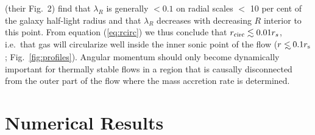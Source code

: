 \documentclass[usenatbib,fleqn]{mn2e}
\newcommand\lsim{\mathrel{\rlap{\lower4pt\hbox{\hskip1pt$\sim$}}
    \raise1pt\hbox{$<$}}}
\begin{document}
\citet{EmsellemCappellari+:2007a} (their Fig.~2) find that $\lambda_R$
is generally $< 0.1$ on radial scales $<$ 10 per cent of the galaxy
half-light radius and that $\lambda_R$ decreases with decreasing $R$ interior to this point.  From equation (\ref{eq:rcirc}) we thus conclude that $r_{\rm
  circ} \lesssim 0.01r_{s}$, i.e.~that gas will circularize well
inside the inner sonic point of the flow ($r\lsim
0.1r_{\rm s}$; Fig.~\ref{fig:profiles}).  Angular momentum should only
become dynamically important for thermally stable flows in a region
that is causally disconnected from the outer part of the flow where
the mass accretion rate is determined.


\section{Numerical Results}
\label{sec:numerical}
\end{document}

